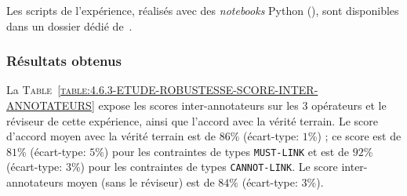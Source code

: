 			\begin{leftBarInformation}
				Les scripts de l'expérience, réalisés avec des \textit{notebooks} Python (\cite{van-rossum-drake:2009:python-reference-manual}), sont disponibles dans un dossier dédié de~\cite{schild:2021:cognitivefactory-interactiveclusteringcomparativestudy}.
			\end{leftBarInformation}
			
		\subsubsection{Résultats obtenus}
		
		
			La \textsc{Table~\ref{table:4.6.3-ETUDE-ROBUSTESSE-SCORE-INTER-ANNOTATEURS}} expose les scores inter-annotateurs sur les $3$ opérateurs et le réviseur de cette expérience, ainsi que l'accord avec la vérité terrain.
			Le score d'accord moyen avec la vérité terrain est de $86$\% (écart-type: $1$\%) ; ce score est de $81$\% (écart-type: $5$\%) pour les contraintes de types \texttt{MUST-LINK} et est de $92$\% (écart-type: $3$\%) pour les contraintes de types \texttt{CANNOT-LINK}.
			Le score inter-annotateurs moyen (sans le réviseur) est de $84$\% (écart-type: $3$\%).
			
